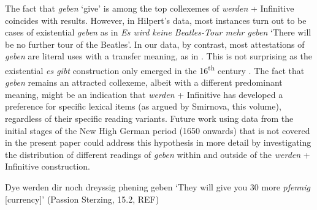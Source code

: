 \documentclass[output=paper,colorlinks,citecolor=brown]{langscibook}
\begin{document}
The fact that \textit{geben} `give' is among the top collexemes of \textit{werden} + Infinitive coincides with  results. However, in Hilpert's data, most instances turn out to be cases of existential \textit{geben} as in \textit{Es wird keine Beatles-Tour mehr geben} `There will be no further tour of the Beatles'. In our data, by contrast, most attestations of \textit{geben} are literal uses with a transfer meaning, as in . This is not surprising as the existential \textit{es gibt} construction only emerged in the 16\textsuperscript{th} century \citep[][]{newmanOriginGermanEs1997, lenzZurGrammatikalisierungGeben2007}. The fact that \textit{geben} remains an attracted collexeme, albeit with a different predominant meaning, might be an indication that \textit{werden} + Infinitive has developed a preference for specific lexical items (as argued by Smirnova, this volume), regardless of their specific reading variants. Future work using data from the initial stages of the New High German period (1650 onwards) that is not covered in the present paper could address this hypothesis in more detail by investigating the distribution of different readings of \textit{geben} within and outside of the \textit{werden} + Infinitive construction.

\ea \label{ex:hs:pfennig}
Dye werden dir noch dreyssig phening geben `They will give you 30 more \textit{pfennig} [currency]' (Passion Sterzing, 15.2, REF)
\z
\end{document}
